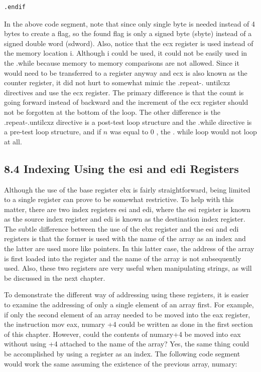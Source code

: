\documentclass[10pt]{article}
\begin{document}
\begin{verbatim}
.endif
\end{verbatim}

In the above code segment, note that since only single byte is needed instead of 4 bytes to create a flag, so the found flag is only a signed byte (sbyte) instead of a signed double word (sdword). Also, notice that the ecx register is used instead of the memory location i. Although i could be used, it could not be easily used in the .while because memory to memory comparisons are not allowed. Since it would need to be transferred to a register anyway and ecx is also known as the counter register, it did not hurt to somewhat mimic the .repeat-. untilcxz directives and use the ecx register. The primary difference is that the count is going forward instead of backward and the increment of the ecx register should not be forgotten at the bottom of the loop. The other difference is the .repeat-.untilcxz directive is a post-test loop structure and the .while directive is a pre-test loop structure, and if $n$ was equal to 0 , the . while loop would not loop at all.

\subsection*{8.4 Indexing Using the esi and edi Registers}
Although the use of the base register ebx is fairly straightforward, being limited to a single register can prove to be somewhat restrictive. To help with this matter, there are two index registers esi and edi, where the esi register is known as the source index register and edi is known as the destination index register. The subtle difference between the use of the ebx register and the esi and edi registers is that the former is used with the name of the array as an index and the latter are used more like pointers. In this latter case, the address of the array is first loaded into the register and the name of the array is not subsequently used. Also, these two registers are very useful when manipulating strings, as will be discussed in the next chapter.

To demonstrate the different way of addressing using these registers, it is easier to examine the addressing of only a single element of an array first. For example, if only the second element of an array needed to be moved into the eax register, the instruction mov eax, numary +4 could be written as done in the first section of this chapter. However, could the contents of numary+4 be moved into eax without using +4 attached to the name of the array? Yes, the same thing could be accomplished by using a register as an index. The following code segment would work the same assuming the existence of the previous array, numary:
\end{document}
